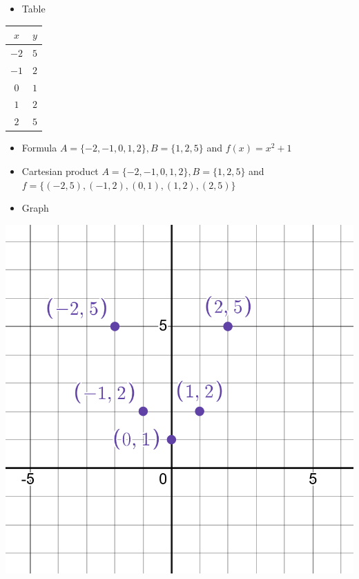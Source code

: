 \documentclass[
]{book}
\providecommand{\tightlist}{%
  \setlength{\itemsep}{0pt}\setlength{\parskip}{0pt}}
\theoremstyle{definition}
\theoremstyle{definition}
\theoremstyle{definition}
\theoremstyle{definition}
\theoremstyle{remark}
\begin{document}
\begin{itemize}
\tightlist
\item
  Table
\end{itemize}

\begin{longtable}[]{@{}cc@{}}
\toprule\noalign{}
\(x\) & \(y\) \\
\midrule\noalign{}
\endhead
\bottomrule\noalign{}
\endlastfoot
\(−2\) & \(5\) \\
\(−1\) & \(2\) \\
\(0\) & \(1\) \\
\(1\) & \(2\) \\
\(2\) & \(5\) \\
\end{longtable}

\begin{itemize}
\tightlist
\item
  Formula \(A = \{-2, -1, 0, 1, 2\}, B = \{1, 2, 5\}\) and \(f(x) = x^2 + 1\)
\item
  Cartesian product \(A = \{-2, -1, 0, 1, 2\}, B = \{1, 2, 5\}\) and \(f = \{(-2, 5), (-1, 2), (0, 1), (1, 2), (2, 5)\}\)
\item
  Graph
\end{itemize}

\includegraphics{fig/fig3.png}
\end{document}
